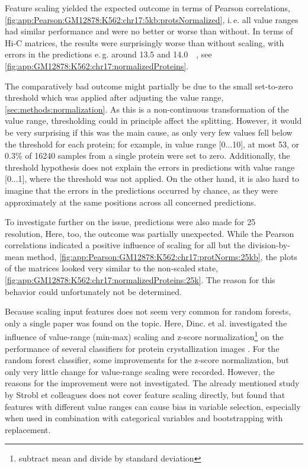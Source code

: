 Feature scaling yielded the expected outcome in terms of Pearson correlations,
\autoref{fig:app:Pearson:GM12878:K562:chr17:5kb:protsNormalized}, i.\,e. all value ranges
had similar performance and were no better or worse than without.
In terms of Hi-C matrices, the results were surprisingly worse than without scaling,
with errors in the predictions e.\,g. around 13.5 and \SI{14.0}{\mega\bp},  
see \autoref{fig:app:GM12878:K562:chr17:normalizedProteins}.

The comparatively bad outcome might partially be due to the small set-to-zero threshold
which was applied after adjusting the value range, \autoref{sec:methods:normalization}.
As this is a non-continuous transformation of the value range, thresholding could in principle affect the splitting.
However, it would be very surprising if this was the main cause, 
as only very few values fell below the threshold for each protein; 
for example, in value range [0...10], at most 53, or 0.3\% of \num{16240} samples from a single protein were set to zero. 
Additionally, the threshold hypothesis does not explain the errors in predictions with value range [0...1],
where the threshold was not applied.
On the other hand, it is also hard to imagine that 
the errors in the predictions occurred by chance, as they were approximately at the same positions across all
concerned predictions.

To investigate further on the issue, predictions were also made for \SI{25}{\kilo\bp} resolution,
Here, too, the outcome was partially unexpected.
While the Pearson correlations indicated a positive influence of scaling for all but
the division-by-mean method, \autoref{fig:app:Pearson:GM12878:K562:chr17:protNorms:25kb},
the plots of the matrices looked very similar to the non-scaled state, 
\autoref{fig:app:GM12878:K562:chr17:normalizedProteins:25k}.
The reason for this behavior could unfortunately not be determined.

Because scaling input features does not seem very common for random forests, only a single paper was
found on the topic.
Here, Dinc. et al. investigated the influence of value-range (min-max) scaling and z-score normalization\footnote{
subtract mean and divide by standard deviation} 
on the performance of several classifiers for protein crystallization images \cite{Dinc2014}.
For the random forest classifier, some improvements for the z-score normalization,
but only very little change for value-range scaling were recorded. 
However, the reasons for the improvement were not investigated.
The already mentioned study by Strobl et colleagues \cite{Strobl2007} does not cover feature scaling
directly, but found that features with different value ranges can cause bias in variable 
selection, especially when used in combination with categorical variables and bootstrapping with replacement.

